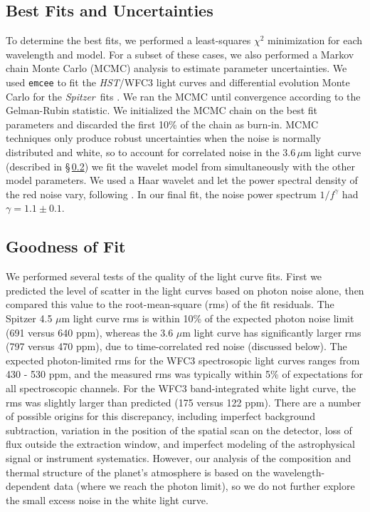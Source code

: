 \documentclass[twocolumn]{aastex61}
\newcommand{\project}[1]{\textsl{#1}}
\newcommand{\HST}{\project{HST}}
\newcommand{\Spitzer}{\project{Spitzer}}
\begin{document}
\subsection{Best Fits and Uncertainties}
To determine the best fits, we performed a least-squares $\chi^2$ minimization for each wavelength and model. For a subset of these cases, we also performed a Markov chain Monte Carlo (MCMC) analysis to estimate parameter uncertainties. We used \texttt{emcee} \citep{foremanmackey13} to fit the \HST/WFC3 light curves and differential evolution Monte Carlo for the \Spitzer\ fits \citep{braak06}. We ran the MCMC until convergence according to the Gelman-Rubin statistic. We initialized the MCMC chain on the best fit parameters and discarded the first 10\% of the chain as burn-in. MCMC techniques only produce robust uncertainties when the noise is normally distributed and white, so to account for correlated noise in the $3.6\,\mu$m light curve (described in \S\,\ref{sec:fitquality}) we fit the wavelet model from \cite{carter09} simultaneously with the other model parameters. We used a Haar wavelet and let the power spectral density of the red noise vary, following \cite{diamond-lowe14}. In our final fit, the noise power spectrum $1/f^\gamma$ had $\gamma = 1.1 \pm 0.1$.  

\subsection{Goodness of Fit}
\label{sec:fitquality}
We performed several tests of the quality of the light curve fits.  First we predicted the level of scatter in the light curves based on photon noise alone, then compared this value to the root-mean-square (rms) of the fit residuals.  The Spitzer 4.5 $\mu$m light curve rms is within 10\% of the expected photon noise limit (691 versus 640 ppm), whereas the 3.6 $\mu$m light curve has significantly larger rms (797 versus 470 ppm), due to time-correlated red noise (discussed below). The expected photon-limited rms for the WFC3 spectrosopic light curves ranges from 430 - 530 ppm, and the measured rms was typically within 5\% of expectations for all spectroscopic channels.  For the WFC3 band-integrated white light curve, the rms was slightly larger than predicted (175 versus 122 ppm). There are a number of possible origins for this discrepancy, including imperfect background subtraction, variation in the position of the spatial scan on the detector, loss of flux outside the extraction window, and imperfect modeling of the astrophysical signal or instrument systematics. However, our analysis of the composition and thermal structure of the planet's atmosphere is based on the wavelength-dependent data (where we reach the photon limit), so we do not further explore the small excess noise in the white light curve. 
\end{document}
